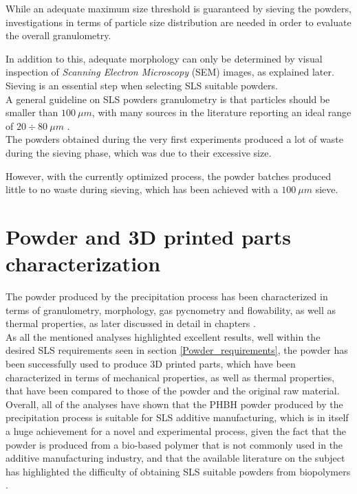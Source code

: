 \documentclass[a4paper]{article}
\begin{document}
    While an adequate maximum size threshold is guaranteed by sieving the powders,
    investigations in terms of particle size distribution are needed in order to evaluate the overall granulometry. 
    
    In addition to this, adequate morphology can only be 
    determined by visual inspection of \textit{Scanning Electron Microscopy} (SEM) images, as explained later. \\

    Sieving is an essential step when selecting SLS suitable powders. \\ 
    A general guideline on SLS powders granulometry is that particles should be smaller than $100 \ \mu m$, with many 
    sources in the literature reporting an ideal range of $20 \div 80 \ \mu m$ \autocites{Padovano_SLS_Review}. \\ 

    The powders obtained during the very first experiments produced a lot of waste during the sieving phase, which was due to their excessive size. 

    However, with the currently optimized process, the powder batches produced little to no waste during sieving, which has been achieved 
    with a $100 \ \mu m$ sieve. \\

    \clearpage

    \section{Powder and 3D printed parts characterization\label{powder_characterization}}

    The powder produced by the precipitation process has been characterized in terms of granulometry, morphology, gas pycnometry and flowability, 
    as well as thermal properties, as later discussed in detail in chapters  . \\

    As all the mentioned analyses highlighted excellent results, well within the desired SLS requirements seen in section \ref{Powder_requirements}, the powder has been successfully 
    used to produce 3D printed parts, which have been characterized in terms of mechanical properties, as well as thermal properties, that have been 
    compared to those of the powder and the original raw material. \\

    Overall, all of the analyses have shown that the PHBH powder produced by the precipitation process is suitable for SLS additive manufacturing, which is in itself a huge achievement for a 
    novel and experimental process, given the fact that the powder is produced from a bio-based polymer that is not commonly used in the additive manufacturing industry, and that 
    the available literature on the subject has highlighted the difficulty of obtaining SLS suitable powders from biopolymers \autocites{Padovano_SLS_Review}. \\ 
\end{document}
